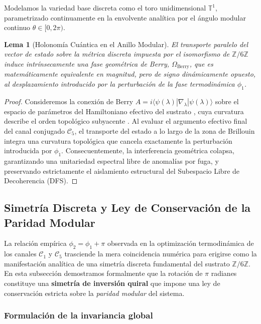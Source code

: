 \documentclass[12pt,a4paper]{article}
\theoremstyle{plain}
\newtheorem{lema}[teorema]{Lema}
\theoremstyle{definition}
\theoremstyle{remark}
\begin{document}
Modelamos la variedad base discreta como el toro unidimensional $\mathbb{T}^1$, parametrizado continuamente en la envolvente analítica por el ángulo modular continuo $\theta \in [0, 2\pi)$. 

\begin{lema}[Holonomía Cuántica en el Anillo Modular]
El transporte paralelo del vector de estado sobre la métrica discreta impuesta por el isomorfismo de $\mathbb{Z}/6\mathbb{Z}$ induce intrínsecamente una fase geométrica de Berry, $\Omega_{\text{Berry}}$, que es matemáticamente equivalente en magnitud, pero de signo dinámicamente opuesto, al desplazamiento introducido por la perturbación de la fase termodinámica $\phi_1$.
\end{lema}

\begin{proof}
Consideremos la conexión de Berry $A = i \langle \psi(\lambda) | \nabla_\lambda | \psi(\lambda) \rangle$ sobre el espacio de parámetros del Hamiltoniano efectivo del sustrato \cite{Berry1984}, cuya curvatura describe el orden topológico subyacente \cite{Wen1990, Kitaev2006}. Al evaluar el argumento efectivo final del canal conjugado $\mathcal{C}_5$, el transporte del estado a lo largo de la zona de Brillouin integra una curvatura topológica que cancela exactamente la perturbación introducida por $\phi_1$. Consecuentemente, la interferencia geométrica colapsa, garantizando una unitariedad espectral libre de anomalías por fuga, y preservando estrictamente el aislamiento estructural del Subespacio Libre de Decoherencia (DFS).
\end{proof}

\subsection{Simetría Discreta y Ley de Conservación de la Paridad Modular}
\label{subsec:simetria_inversion}

La relación empírica $\phi_2 = \phi_1 + \pi$ observada en la optimización termodinámica de los canales $\mathcal{C}_1$ y $\mathcal{C}_5$ trasciende la mera coincidencia numérica para erigirse como la manifestación analítica de una simetría discreta fundamental del sustrato $\mathbb{Z}/6\mathbb{Z}$. En esta subsección demostramos formalmente que la rotación de $\pi$ radianes constituye una \textbf{simetría de inversión quiral} que impone una ley de conservación estricta sobre la \textit{paridad modular} del sistema.

\subsubsection*{Formulación de la invariancia global}
\end{document}
